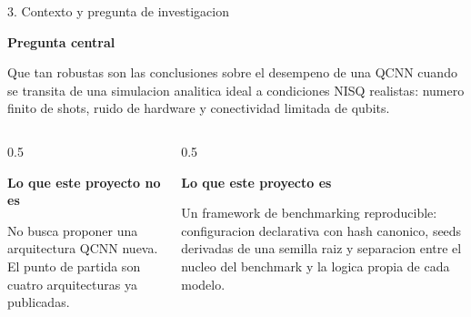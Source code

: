 \documentclass[aspectratio=169]{beamer}
\newcommand{\bmheading}[2]{\textbf{\color{#1}#2}\par\smallskip}
\begin{document}
\begin{frame}{3. Contexto y pregunta de investigacion}
  \begin{indigobox}
    \bmheading{bmIndigo}{Pregunta central}
    Que tan robustas son las conclusiones sobre el desempeno de una QCNN cuando se
    transita de una simulacion analitica ideal a condiciones NISQ realistas: numero
    finito de shots, ruido de hardware y conectividad limitada de qubits.
  \end{indigobox}

  \vspace{10pt}

  \begin{columns}[T]
    \begin{column}{0.5\textwidth}
      \begin{greenbox}
        \bmheading{bmGreen}{Lo que este proyecto no es}
        No busca proponer una arquitectura QCNN nueva. El punto de partida son cuatro
        arquitecturas ya publicadas.
      \end{greenbox}
    \end{column}
    \begin{column}{0.5\textwidth}
      \begin{amberbox}
        \bmheading{bmAmber}{Lo que este proyecto es}
        Un framework de benchmarking reproducible: configuracion declarativa con hash
        canonico, seeds derivadas de una semilla raiz y separacion entre el nucleo del
        benchmark y la logica propia de cada modelo.
      \end{amberbox}
    \end{column}
  \end{columns}
\end{frame}
\end{document}
